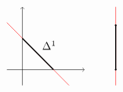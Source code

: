 \documentclass[10pt]{article}
\begin{document}
\[\begin{tikzpicture}
  \draw[->] (0, -1/2) -- (0, 2);
  \draw[->] (-1/2, 0) -- (2, 0);

  \draw[color = red] (3/2, -1/2) -- (-1/2, 3/2);
  
  \draw[line width = 1pt] (1,0) -- node[above right] {\(\Delta^1\)} (0,1);

  \draw[color = red] (3, -1/2) -- (3, 2);

  \draw[line width = 1pt] (3, 0) -- (3, 1.414);

  \node[circle, fill = black, inner sep = 0.2mm] at (3, 0) {};
  \node[circle, fill = black, inner sep = 0.2mm] at (3, 1.414) {};
\end{tikzpicture}\]
\end{document}
